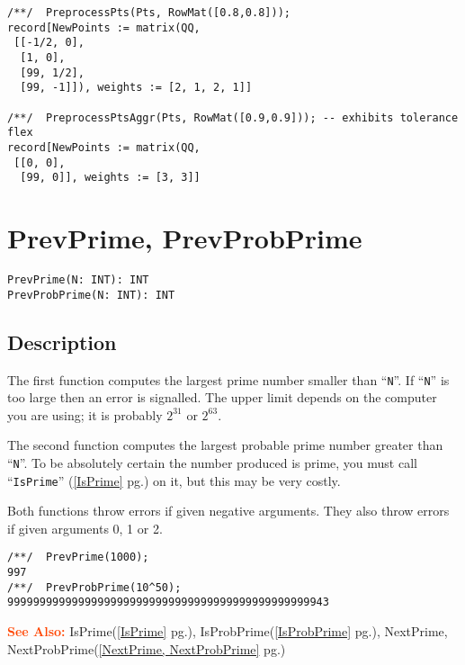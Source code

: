 \documentclass[a4paper]{mybook}
\newenvironment{command}{}{} %
\newcommand\SeeAlso{\par\textcolor{OrangeRed}{\textbf{\large See Also: }}}
\begin{document}
\begin{command}
\begin{Verbatim}[label=example, rulecolor=\color{PineGreen}, frame=single]
/**/  PreprocessPts(Pts, RowMat([0.8,0.8]));
record[NewPoints := matrix(QQ,
 [[-1/2, 0],
  [1, 0],
  [99, 1/2],
  [99, -1]]), weights := [2, 1, 2, 1]]

/**/  PreprocessPtsAggr(Pts, RowMat([0.9,0.9])); -- exhibits tolerance flex
record[NewPoints := matrix(QQ,
 [[0, 0],
  [99, 0]], weights := [3, 3]]
\end{Verbatim}


\end{command} %

\section{PrevPrime, PrevProbPrime}
\label{PrevPrime, PrevProbPrime}
\begin{command} %


\begin{Verbatim}[label=syntax, rulecolor=\color{MidnightBlue},
frame=single]
PrevPrime(N: INT): INT
PrevProbPrime(N: INT): INT
\end{Verbatim}


\subsection*{Description}

The first function computes the largest prime number smaller than ``\verb&N&''.
If ``\verb&N&'' is too large then an error is signalled.  The upper
limit depends on the computer you are using; it is probably $2^31$
or $2^63$.
\par 
The second function computes the largest probable prime number greater than ``\verb&N&''.  
To be absolutely certain the number produced is prime,
you must call ``\verb&IsPrime&'' (\ref{IsPrime} pg.\pageref{IsPrime}) on it, but this may be very costly.
\par 
Both functions throw errors if given negative arguments.  They also
throw errors if given arguments 0, 1 or 2.
\begin{Verbatim}[label=example, rulecolor=\color{PineGreen}, frame=single]
/**/  PrevPrime(1000);
997
/**/  PrevProbPrime(10^50);
99999999999999999999999999999999999999999999999943
\end{Verbatim}


\SeeAlso %
  IsPrime(\ref{IsPrime} pg.\pageref{IsPrime}), 
    IsProbPrime(\ref{IsProbPrime} pg.\pageref{IsProbPrime}), 
    NextPrime, NextProbPrime(\ref{NextPrime, NextProbPrime} pg.\pageref{NextPrime, NextProbPrime})
\end{command} %
\end{document}

